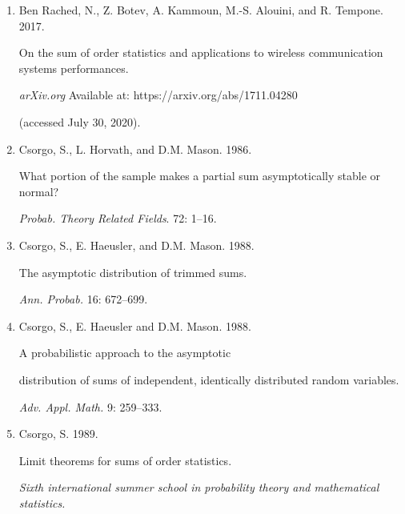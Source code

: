 \documentclass[14pt,a4paper]{extarticle}
\begin{document}
\begin{enumerate}

\renewcommand{\labelenumi}{\theenumi.}

\setlength{\itemsep}{1pt}

\setlength{\parskip}{1pt}





\item

Ben Rached, N., Z. Botev, A. Kammoun, M.-S. Alouini, and R. Tempone. 2017.

On the sum of order statistics and applications to wireless communication systems performances.

{\it arXiv.org} Available at: https://arxiv.org/abs/1711.04280 

(accessed July 30, 2020).



\item

Csorgo, S., L. Horvath, and D.M. Mason. 1986.

What portion of the sample makes a partial sum asymptotically stable or normal?

{\it Probab. Theory Related Fields}. 72: 1--16.



\item

Csorgo, S., E. Haeusler, and D.M. Mason. 1988.

The asymptotic distribution of trimmed sums.

{\it Ann. Probab.} 16: 672--699.



\item

Csorgo, S., E. Haeusler and D.M. Mason. 1988.

A probabilistic approach to the asymptotic

distribution of sums of independent, identically distributed random variables.

{\it Adv. Appl. Math.} 9: 259--333.



\item

Csorgo, S. 1989. 

Limit theorems for sums of order statistics. 

{\it Sixth international summer school in probability theory and mathematical statistics.}


\end{enumerate}
\end{document}
